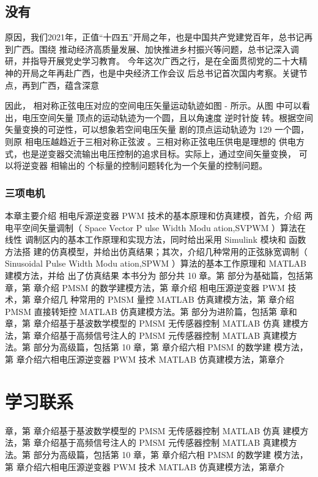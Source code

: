 \documentclass[normal,cn,hang,blue,ctexfont,chinese]{mycls}
\begin{document}
	\section{没有}  
	原因，我们2021年，正值“十四五”开局之年，也是中国共产党建党百年，总书记再到广西。围绕
	推动经济高质量发展、加快推进乡村振兴等问题，总书记深入调研，并指导开展党史学习教育。
	今年这次广西之行，是在全面贯彻党的二十大精神的开局之年再赴广西，也是中央经济工作会议
	后总书记首次国内考察。关键节点，再到广西，蕴含深意

		因此， 相对称正弦电压对应的空间电压矢量运动轨迹如图 - 所示。从图
	中可以看出，电压空间矢量 顶点的运动轨迹为一个圆，且以角速度 逆时针旋
	转。根据空间矢量变换的可逆性，可以想象若空间电压矢量 剧的顶点运动轨迹为 129 
	一个圆，则原 相电压越趋近于三相对称正弦波 。三相对称正弦电压供电是理想的
	供电方式，也是逆变器交流输出电压控制的追求目标。实际上，通过空间矢量变换，
	可以将逆变器 相输出的 个标量的控制问题转化为一个矢量的控制问题。
	\subsection{三项电机} 
	本章主要介绍 相电斥源逆变器 PWM 技术的基本原理和仿真建模，首先，介绍
	两电平空间矢量调制（ Space Vector P ulse Width Modu ation,SVPWM ）算法在线性
	调制区内的基本工作原理和实现方法，同时给出采用 Simulink 模块和 函数方法搭
	建的仿真模型，并给出仿真结果；其次，介绍几种常用的正弦脉宽调制（ Sinusoidal 
	Pulse Width Modu ation,SPWM ）算法的基本工作原理和 MATLAB 建模方法，并给
	出了仿真结果
		本书分为 部分共 10 章。第 部分为基础篇，包括第 章，第 章介绍
	PMSM 的数学建模方法，第 章介绍 相电压源逆变器 PWM 技术，第 章介绍几
	种常用的 PMSM 量控 MATLAB 仿真建模方法，第 章介绍 PMSM
	直接转矩控 MATLAB 仿真建模方法。第 部分为进阶篇，包括第 章和
	章，第 章介绍基于基波数学模型的 PMSM 无传感器控制 MATLAB 仿真
	建模方法，第 章介绍基于高频信号注人的 PMSM 元传感器控制 MATLAB
	真建模方法。第 部分为高级篇，包括第 10 章，第 章介绍六相 PMSM 的数学建
	模方法，第 章介绍六相电压源逆变器 PWM 技术 MATLAB 仿真建模方法，第章介


	
	

\chapter{学习联系}
章，第 章介绍基于基波数学模型的 PMSM 无传感器控制 MATLAB 仿真
	建模方法，第 章介绍基于高频信号注人的 PMSM 元传感器控制 MATLAB
	真建模方法。第 部分为高级篇，包括第 10 章，第 章介绍六相 PMSM 的数学建
	模方法，第 章介绍六相电压源逆变器 PWM 技术 MATLAB 仿真建模方法，第章介
\end{document}
